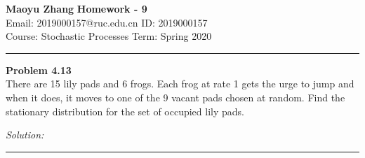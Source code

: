 \documentclass[a4paper, 11pt]{article}
\newenvironment{problem}[2][Problem]
    { \begin{mdframed}[backgroundcolor=gray!20] \textbf{#1 #2} \\}
    {  \end{mdframed}}
\newenvironment{solution}
    {\textit{Solution:}}
    {}
\begin{document}
\noindent
\large\textbf{Maoyu Zhang} \hfill \textbf{Homework - 9}   \\
Email: 2019000157@ruc.edu.cn \hfill ID: 2019000157 \\
\normalsize Course: Stochastic Processes \hfill Term: Spring 2020\\
\noindent\rule{7in}{2.8pt}
\begin{problem}{4.13}
There are 15 lily pads and 6 frogs. Each frog at rate 1 gets the urge to jump and when it does, it moves to one of the 9 vacant pads chosen at random. Find the stationary distribution for the set of occupied lily pads.


\end{problem}
\begin{solution}


\end{solution} 
\noindent\rule{7in}{2.8pt}

\end{document}

